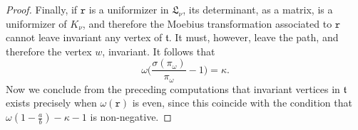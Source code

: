\documentclass[10pt,a4paper]{amsart}
\begin{document}
\begin{proof}
    Finally, if $\mathtt{r}$ is a uniformizer 
    in $\mathfrak{L}_\nu$,
    its determinant, as a matrix, is a uniformizer of $K_\nu$, 
    and therefore the Moebius transformation associated to 
    $\mathtt{r}$ cannot leave invariant any vertex of 
    $\mathfrak{t}$. It must, however, leave the path, and 
    therefore the vertex $w$, invariant. It follows that
    $$\omega\Big(\frac{\sigma(\pi_\omega)}{\pi_\omega}-1\Big)=
    \kappa.$$
    Now we conclude from the preceding computations that
    invariant vertices in $\mathfrak{t}$ exists precisely when
    $\omega(\mathtt{r})$ is even, since this coincide with the 
    condition that $\omega\left(1-\frac ab\right)-\kappa-1$
    is non-negative.
\end{proof}
\end{document}
